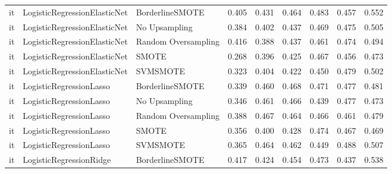 \begin{tabular}{lllllllll}
      it & LogisticRegressionElasticNet &     BorderlineSMOTE & 0.405 &                     0.431 &                 0.464 &                  0.483 &                                   0.457 &     0.552 \\
      it & LogisticRegressionElasticNet &       No Upsampling & 0.384 &                     0.402 &                 0.437 &                  0.469 &                                   0.475 &     0.505 \\
      it & LogisticRegressionElasticNet & Random Oversampling & 0.416 &                     0.388 &                 0.437 &                  0.461 &                                   0.474 &     0.494 \\
      it & LogisticRegressionElasticNet &               SMOTE & 0.268 &                     0.396 &                 0.425 &                  0.467 &                                   0.456 &     0.473 \\
      it & LogisticRegressionElasticNet &            SVMSMOTE & 0.323 &                     0.404 &                 0.422 &                  0.450 &                                   0.479 &     0.502 \\
      it &      LogisticRegressionLasso &     BorderlineSMOTE & 0.339 &                     0.460 &                 0.468 &                  0.471 &                                   0.477 &     0.481 \\
      it &      LogisticRegressionLasso &       No Upsampling & 0.346 &                     0.461 &                 0.466 &                  0.439 &                                   0.477 &     0.473 \\
      it &      LogisticRegressionLasso & Random Oversampling & 0.388 &                     0.467 &                 0.464 &                  0.466 &                                   0.461 &     0.479 \\
      it &      LogisticRegressionLasso &               SMOTE & 0.356 &                     0.400 &                 0.428 &                  0.474 &                                   0.467 &     0.469 \\
      it &      LogisticRegressionLasso &            SVMSMOTE & 0.365 &                     0.464 &                 0.462 &                  0.449 &                                   0.488 &     0.507 \\
      it &      LogisticRegressionRidge &     BorderlineSMOTE & 0.417 &                     0.424 &                 0.454 &                  0.473 &                                   0.437 &     0.538 \\

\end{tabular}

